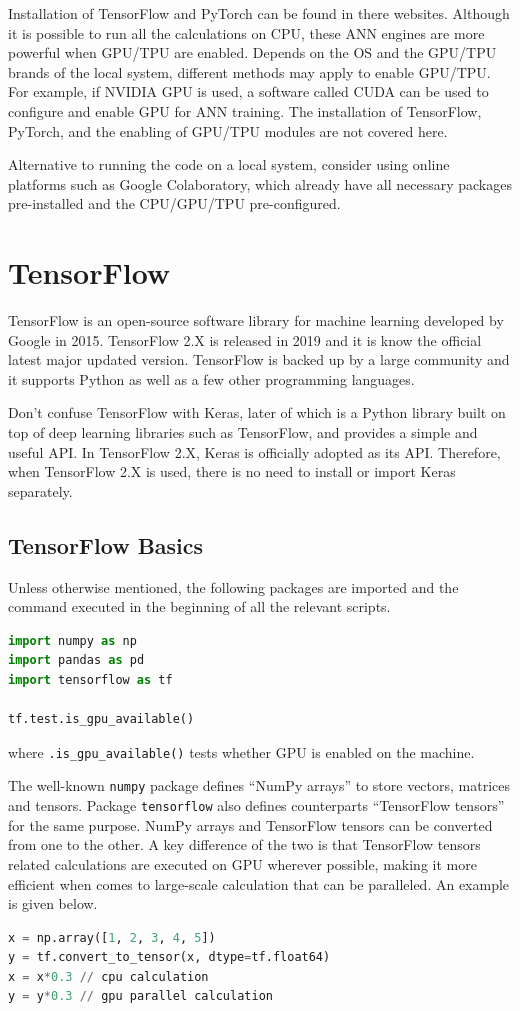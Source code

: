 Installation of TensorFlow and PyTorch can be found in there websites. Although it is possible to run all the calculations on CPU, these ANN engines are more powerful when GPU/TPU are enabled. Depends on the OS and the GPU/TPU brands of the local system, different methods may apply to enable GPU/TPU. For example, if NVIDIA GPU is used, a software called CUDA can be used to configure and enable GPU for ANN training. The installation of TensorFlow, PyTorch, and the enabling of GPU/TPU modules are not covered here.

Alternative to running the code on a local system, consider using online platforms such as Google Colaboratory, which already have all necessary packages pre-installed and the CPU/GPU/TPU pre-configured.

\section{TensorFlow}

TensorFlow is an open-source software library for machine learning developed by Google in 2015. TensorFlow 2.X is released in 2019 and it is know the official latest major updated version. TensorFlow is backed up by a large community and it supports Python as well as a few other programming languages.

Don't confuse TensorFlow with Keras, later of which is a Python library built on top of deep learning libraries such as TensorFlow, and provides a simple and useful API. In TensorFlow 2.X, Keras is officially adopted as its API. Therefore, when TensorFlow 2.X is used, there is no need to install or import Keras separately.

\subsection{TensorFlow Basics}

Unless otherwise mentioned, the following packages are imported and the command executed in the beginning of all the relevant scripts.
\begin{lstlisting}[language=Python]
import numpy as np
import pandas as pd
import tensorflow as tf

tf.test.is_gpu_available()
\end{lstlisting}
where \verb|.is_gpu_available()| tests whether GPU is enabled on the machine.

The well-known \verb|numpy| package defines ``NumPy arrays'' to store vectors, matrices and tensors. Package \verb|tensorflow| also defines counterparts ``TensorFlow tensors'' for the same purpose. NumPy arrays and TensorFlow tensors can be converted from one to the other. A key difference of the two is that TensorFlow tensors related calculations are executed on GPU wherever possible, making it more efficient when comes to large-scale calculation that can be paralleled. An example is given below.
\begin{lstlisting}[language=Python]
x = np.array([1, 2, 3, 4, 5])
y = tf.convert_to_tensor(x, dtype=tf.float64)
x = x*0.3 // cpu calculation
y = y*0.3 // gpu parallel calculation
\end{lstlisting}

